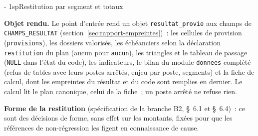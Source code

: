 \documentclass[a4paper,11pt]{article}
\makeatletter
\newcommand{\titrebandeau}[1]{%
  \noindent{\color{financeblue}\rule{\linewidth}{2.5pt}}
  \par\vspace{5mm}
  {\color{greenline}\raggedright\fontsize{19}{23}\bfseries\selectfont #1\par}
  \vspace{6mm}}
\newcommand{\charte@bandeau}[1]{%
  \parindent\z@ \everypar{\strut}%
  {\strut\par}\nobreak
  \titrebandeau{#1}\nobreak
  \kern\z@\nobreak\strut\par}
\newcommand{\charte@reserve}[1]{\par\ifinner\else\if@nobreak\else
  \penalty\z@ %
  \begingroup\setlength{\dimen@}{#1}%
  \dimen@ii\pagegoal \advance\dimen@ii-\pagetotal
  \ifdim\pagegoal=\maxdimen\else\ifdim\dimen@>\dimen@ii
    \vfil\penalty-\@M %
  \fi\fi\endgroup\fi\fi}
\renewcommand{\section}{\charte@reserve{12\baselineskip}%
  \@startsection{section}{1}{\z@}%
  {\z@}{1sp}{\normalfont\charte@bandeau}}
\newcommand{\code}[1]{\texttt{\small #1}}
\makeatother
\begin{document}
\section{Restitution par segment et totaux}
\label{sec:totaux}

\textbf{Objet rendu.} Le point d'entrée rend un objet
\code{resultat\_\allowbreak provie} aux champs de \code{CHAMPS\_RESULTAT}
(section~\ref{sec:rapport-empreintes})~: les cellules de provision
(\code{provisions}), les dossiers valorisés, les échéanciers selon la
déclaration \code{restitution} du plan (aucun pour \code{aucun}), les
triangles et le tableau de passage (\code{NULL} dans l'état du code), les
indicateurs, le bilan du module \code{donnees} complété (refus de tables
avec leurs postes arrêtés, enjeu par poste, segments) et la fiche de
calcul, dont les empreintes du résultat et du code sont remplies en dernier.
Le calcul lit le plan canonique, celui de la fiche~; un poste arrêté ne
refuse rien.

\textbf{Forme de la restitution} (spécification de la branche B2, §~6.1
et §~6.4)~: ce sont des décisions de forme, sans effet sur les montants,
fixées pour que les références de non-régression les figent en
connaissance de cause.
\end{document}

